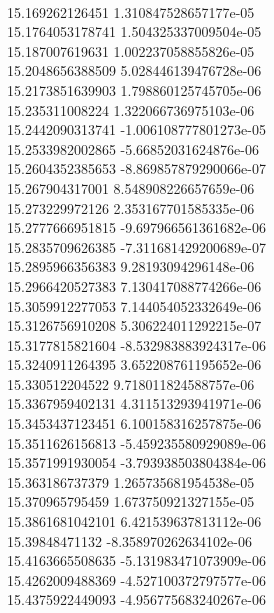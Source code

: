 { \\
15.169262126451 1.310847528657177e-05
 \\
15.1764053178741 1.504325337009504e-05
 \\
15.187007619631 1.002237058855826e-05
 \\
15.2048656388509 5.028446139476728e-06
 \\
15.2173851639903 1.798860125745705e-06
 \\
15.235311008224 1.322066736975103e-06
 \\
15.2442090313741 -1.006108777801273e-05
 \\
15.2533982002865 -5.66852031624876e-06
 \\
15.2604352385653 -8.869857879290066e-07
 \\
15.267904317001 8.548908226657659e-06
 \\
15.273229972126 2.353167701585335e-06
 \\
15.2777666951815 -9.697966561361682e-06
 \\
15.2835709626385 -7.311681429200689e-07
 \\
15.2895966356383 9.28193094296148e-06
 \\
15.2966420527383 7.130417088774266e-06
 \\
15.3059912277053 7.144054052332649e-06
 \\
15.3126756910208 5.306224011292215e-07
 \\
15.3177815821604 -8.532983883924317e-06
 \\
15.3240911264395 3.652208761195652e-06
 \\
15.330512204522 9.718011824588757e-06
 \\
15.3367959402131 4.311513293941971e-06
 \\
15.3453437123451 6.100158316257875e-06
 \\
15.3511626156813 -5.459235580929089e-06
 \\
15.3571991930054 -3.793938503804384e-06
 \\
15.363186737379 1.265735681954538e-05
 \\
15.370965795459 1.673750921327155e-05
 \\
15.3861681042101 6.421539637813112e-06
 \\
15.39848471132 -8.358970262634102e-06
 \\
15.4163665508635 -5.131983471073909e-06
 \\
15.4262009488369 -4.527100372797577e-06
 \\
15.4375922449093 -4.956775683240267e-06
 \\
}
